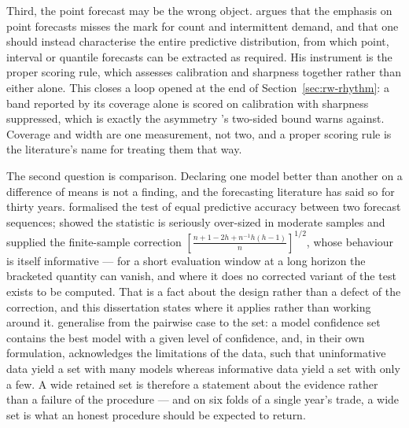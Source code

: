 Third, the point forecast may be the wrong object.
\citet{kolassa_evaluating_2016} argues that the emphasis on point forecasts
misses the mark for count and intermittent demand, and that one should instead
characterise the entire predictive distribution, from which point, interval or
quantile forecasts can be extracted as required. His instrument is the proper
scoring rule, which assesses calibration and sharpness together rather than
either alone. This closes a loop opened at the end of
Section~\ref{sec:rw-rhythm}: a band reported by its coverage alone is scored on
calibration with sharpness suppressed, which is exactly the asymmetry
\citet{angelopoulos_conformal_2023}'s two-sided bound warns against. Coverage
and width are one measurement, not two, and a proper scoring rule is the
literature's name for treating them that way.

The second question is comparison. Declaring one model better than another on a
difference of means is not a finding, and the forecasting literature has said
so for thirty years. \citet{diebold_comparing_1995} formalised the test of
equal predictive accuracy between two forecast sequences;
\citet{harvey_testing_1997} showed the statistic is seriously over-sized in
moderate samples and supplied the finite-sample correction
$\left[\frac{n + 1 - 2h + n^{-1}h(h-1)}{n}\right]^{1/2}$, whose behaviour is
itself informative --- for a short evaluation window at a long horizon the
bracketed quantity can vanish, and where it does no corrected variant of the
test exists to be computed. That is a fact about the design rather than a
defect of the correction, and this dissertation states where it applies rather
than working around it. \citet{hansen_model_2011} generalise from the pairwise
case to the set: a model confidence set contains the best model with a given
level of confidence, and, in their own formulation, acknowledges the limitations
of the data, such that uninformative data yield a set with many models whereas
informative data yield a set with only a few. A wide retained set is therefore
a statement about the evidence rather than a failure of the procedure --- and
on six folds of a single year's trade, a wide set is what an honest procedure
should be expected to return.

